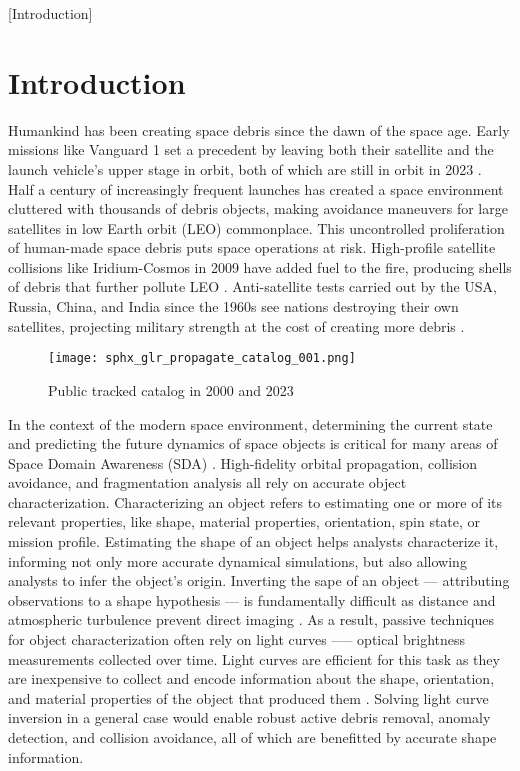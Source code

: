 [Introduction]
\graphicspath{{/Users/liamrobinson/Documents/PyLightCurves/docs/build/html/_images}}

\chapter{Introduction}

Humankind has been creating space debris since the dawn of the space age. Early missions like Vanguard 1 set a precedent by leaving both their satellite and the launch vehicle's upper stage in orbit, both of which are still in orbit in 2023 \cite{vanguard1}. Half a century of increasingly frequent launches has created a space environment cluttered with thousands of debris objects, making avoidance maneuvers for large satellites in low Earth orbit (LEO) commonplace. This uncontrolled proliferation of human-made space debris puts space operations at risk. High-profile satellite collisions like Iridium-Cosmos in 2009 have added fuel to the fire, producing shells of debris that further pollute LEO \cite{vallado4ed}. Anti-satellite tests carried out by the USA, Russia, China, and India since the 1960s see nations destroying their own satellites, projecting military strength at the cost of creating more debris \cite{vallado4ed}.

\begin{figure}[ht]
    \centering
    \texttt{[image: sphx\_glr\_propagate\_catalog\_001.png]}
    \caption{Public tracked catalog in 2000 and 2023}
    \label{fig:catalog_comparison}
\end{figure}

In the context of the modern space environment, determining the current state and predicting the future dynamics of space objects is critical for many areas of Space Domain Awareness (SDA) \cite{frueh2019notes}. High-fidelity orbital propagation, collision avoidance, and fragmentation analysis all rely on accurate object characterization. Characterizing an object refers to estimating one or more of its relevant properties, like shape, material properties, orientation, spin state, or mission profile. Estimating the shape of an object helps analysts characterize it, informing not only more accurate dynamical simulations, but also allowing analysts to infer the object's origin. Inverting the sape of an object --- attributing observations to a shape hypothesis --- is fundamentally difficult as distance and atmospheric turbulence prevent direct imaging \cite{fan2020thesis}. As a result, passive techniques for object characterization often rely on light curves --— optical brightness measurements collected over time. Light curves are  efficient for this task as they are inexpensive to collect and encode information about the shape, orientation, and material properties of the object that produced them \cite{fan2020thesis, burton2021mapping}. Solving light curve inversion in a general case would enable robust active debris removal, anomaly detection, and collision avoidance, all of which are benefitted by accurate shape information.

